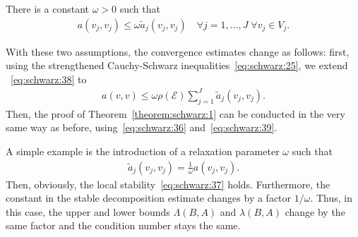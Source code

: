 \begin{assumption}
  \label{assumption:schwarz:local-stability}
  There is a constant $\omega > 0$ such that
  \begin{gather}
    \label{eq:schwarz:37}
    a(v_j, v_j) \le \omega \widetilde a_j(v_j, v_j)
    \quad\forall j=1,\dots,J \; \forall v_j\in V_j.
  \end{gather}
\end{assumption}

\begin{remark}
  With these two assumptions, the convergence estimates change as
  follows: first, using the strengthened Cauchy-Schwarz
  inequalities~\eqref{eq:schwarz:25}, we extend ~\eqref{eq:schwarz:38}
  to
  \begin{gather}
    \label{eq:schwarz:39}
    a(v,v) \le \omega \rho(\mathcal E) \sum_{j=1}^J \widetilde a_j(v_j, v_j).
  \end{gather}
  Then, the proof of Theorem~\ref{theorem:schwarz:1} can be conducted
  in the very same way as before, using~\eqref{eq:schwarz:36}
  and~\eqref{eq:schwarz:39}.
\end{remark}

\begin{example}
  A simple example is the introduction of a relaxation parameter
  $\omega$ such that
  \begin{gather*}
    \widetilde a_j(v_j, v_j) = \frac1\omega a(v_j, v_j).
  \end{gather*}
  Then, obviously, the local stability~\eqref{eq:schwarz:37}
  holds. Furthermore, the constant in the stable decomposition
  estimate changes by a factor $1/\omega$. Thus, in this case, the
  upper and lower bounds $\Lambda(B,A)$ and $\lambda(B,A)$ change by
  the same factor and the condition number stays the same.
\end{example}

